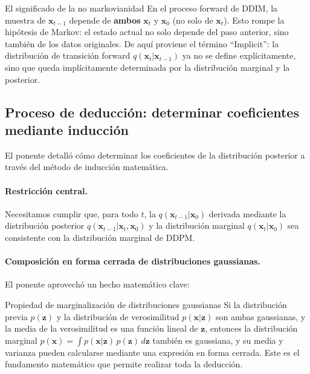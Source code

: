 \documentclass[a4paper]{article}
\begin{document}
\begin{warningbox}{El significado de la no markovianidad}
En el proceso forward de DDIM, la muestra de $\mathbf{x}_{t-1}$ depende de \textbf{ambos} $\mathbf{x}_t$ y $\mathbf{x}_0$ (no solo de $\mathbf{x}_t$). Esto rompe la hipótesis de Markov: el estado actual no solo depende del paso anterior, sino también de los datos originales. De aquí proviene el término ``Implicit'': la distribución de transición forward $q(\mathbf{x}_t|\mathbf{x}_{t-1})$ ya no se define explícitamente, sino que queda implícitamente determinada por la distribución marginal y la posterior.
\end{warningbox}

\subsection{Proceso de deducción: determinar coeficientes mediante inducción}

El ponente detalló cómo determinar los coeficientes de la distribución posterior a través del método de inducción matemática.

\paragraph{Restricción central.} Necesitamos cumplir que, para todo $t$, la $q(\mathbf{x}_{t-1}|\mathbf{x}_0)$ derivada mediante la distribución posterior $q(\mathbf{x}_{t-1}|\mathbf{x}_t, \mathbf{x}_0)$ y la distribución marginal $q(\mathbf{x}_t|\mathbf{x}_0)$ sea consistente con la distribución marginal de DDPM.

\paragraph{Composición en forma cerrada de distribuciones gaussianas.} El ponente aprovechó un hecho matemático clave:

\begin{knowledgebox}{Propiedad de marginalización de distribuciones gaussianas}
Si la distribución previa $p(\mathbf{z})$ y la distribución de verosimilitud $p(\mathbf{x}|\mathbf{z})$ son ambas gaussianas, y la media de la verosimilitud es una función lineal de $\mathbf{z}$, entonces la distribución marginal $p(\mathbf{x}) = \int p(\mathbf{x}|\mathbf{z})\,p(\mathbf{z})\,d\mathbf{z}$ también es gaussiana, y su media y varianza pueden calcularse mediante una expresión en forma cerrada. Este es el fundamento matemático que permite realizar toda la deducción.
\end{knowledgebox}
\end{document}
